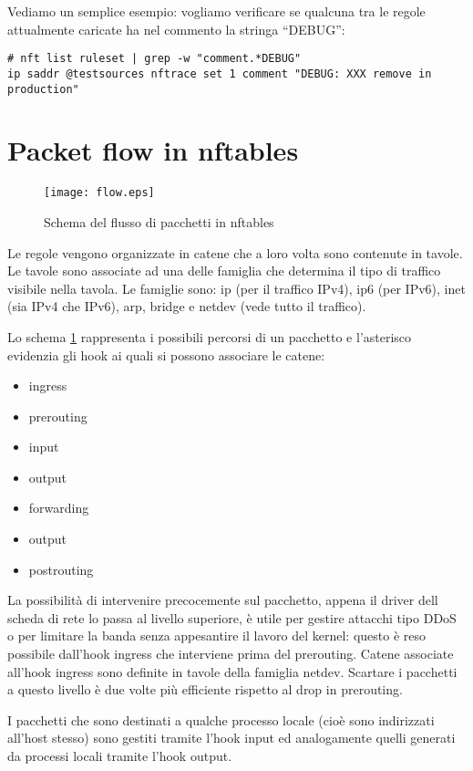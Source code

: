 Vediamo un semplice esempio: vogliamo verificare se qualcuna tra le regole
attualmente caricate ha nel commento la stringa ``DEBUG'':
\begin{lstlisting}
# nft list ruleset | grep -w "comment.*DEBUG"
ip saddr @testsources nftrace set 1 comment "DEBUG: XXX remove in production"
\end{lstlisting}

\section{Packet flow in nftables}

\begin{figure}[H]
    \centering
    \texttt{[image: flow.eps]}
    \caption{Schema del flusso di pacchetti in nftables}
    \label{fig:flow}
\end{figure}
Le regole vengono organizzate in catene che a loro volta sono contenute in
tavole. Le tavole sono associate ad una delle famiglia che determina il tipo
di traffico visibile nella tavola. Le famiglie sono: ip (per il traffico
IPv4), ip6 (per IPv6),
inet (sia IPv4 che IPv6), arp, bridge e netdev (vede tutto il traffico).

Lo schema \ref{fig:flow} rappresenta i possibili percorsi di un pacchetto e
l'asterisco evidenzia gli hook ai quali si possono associare le catene:
\begin{itemize}
    \item ingress
    \item prerouting
    \item input
    \item output
    \item forwarding
    \item output
    \item postrouting
\end{itemize}
La possibilit\`a di intervenire precocemente sul pacchetto, appena il driver
dell scheda di rete lo passa al livello superiore, \`e utile per gestire
attacchi tipo DDoS o per limitare la banda senza appesantire il lavoro del
kernel: questo \`e reso possibile dall'hook ingress che interviene prima del
prerouting.
Catene associate all'hook ingress sono definite in tavole della
famiglia netdev. Scartare i pacchetti a questo livello \`e due volte
pi\`u efficiente rispetto al drop in prerouting.

I pacchetti che sono destinati a qualche processo locale (cioè sono indirizzati
all'host stesso) sono gestiti tramite l'hook input ed analogamente quelli
generati da processi locali tramite l'hook output.

